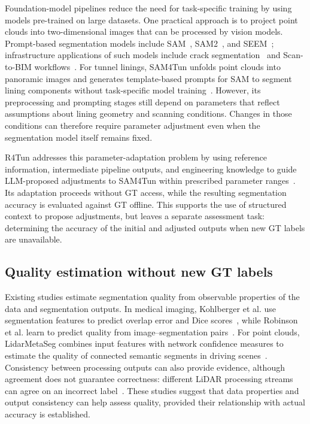 \documentclass[a4paper,fleqn]{cas-dc}
\begin{document}
{Foundation-model pipelines reduce the need for task-specific training by using models pre-trained on large datasets. One practical approach is to project point clouds into two-dimensional images that can be processed by vision models. Prompt-based segmentation models include SAM~\cite{kirillov2023sam}, SAM2~\cite{ravi2024sam2}, and SEEM~\cite{zou2023segment}; infrastructure applications of such models include crack segmentation~\cite{ge2024cracksam,ye2024sam} and Scan-to-BIM workflows~\cite{wang2024omni,pan2024zero,ye2026maintenance}. For tunnel linings, SAM4Tun unfolds point clouds into panoramic images and generates template-based prompts for SAM to segment lining components without task-specific model training~\cite{ye2025sam4tun}. However, its preprocessing and prompting stages still depend on parameters that reflect assumptions about lining geometry and scanning conditions. Changes in those conditions can therefore require parameter adjustment even when the segmentation model itself remains fixed.

R4Tun addresses this parameter-adaptation problem by using reference information, intermediate pipeline outputs, and engineering knowledge to guide LLM-proposed adjustments to SAM4Tun within prescribed parameter ranges~\cite{taoR4Tun}. Its adaptation proceeds without GT access, while the resulting segmentation accuracy is evaluated against GT offline. This supports the use of structured context to propose adjustments, but leaves a separate assessment task: determining the accuracy of the initial and adjusted outputs when new GT labels are unavailable.

\subsection{Quality estimation without new GT labels}

Existing studies estimate segmentation quality from observable properties of the data and segmentation outputs. In medical imaging, Kohlberger et al. use segmentation features to predict overlap error and Dice scores~\cite{kohlberger2012evaluating}, while Robinson et al. learn to predict quality from image--segmentation pairs~\cite{robinson2018segmentationQuality}. For point clouds, LidarMetaSeg combines input features with network confidence measures to estimate the quality of connected semantic segments in driving scenes~\cite{colling2021lidarmetaseg}. Consistency between processing outputs can also provide evidence, although agreement does not guarantee correctness: different LiDAR processing streams can agree on an incorrect label~\cite{bogdoll2025labelfree}. These studies suggest that data properties and output consistency can help assess quality, provided their relationship with actual accuracy is established.

}
\end{document}
